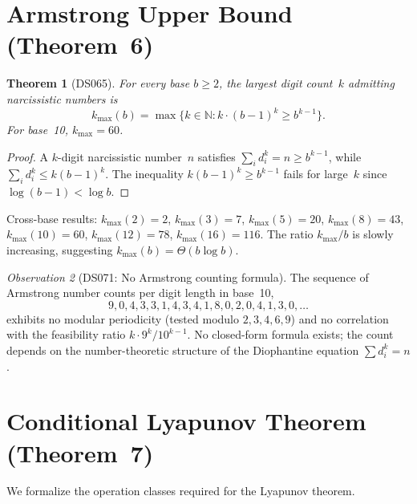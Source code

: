 \documentclass[11pt,a4paper]{amsart}
\theoremstyle{plain}
\newtheorem{theorem}{Theorem}
\theoremstyle{definition}
\theoremstyle{remark}
\newtheorem{observation}[theorem]{Observation}
\begin{document}
\section{Armstrong Upper Bound (Theorem~6)}\label{sec:armstrong}

\begin{theorem}[DS065]\label{thm:armstrong}
For every base $b \geq 2$, the largest digit count~$k$ admitting narcissistic
numbers is
\[
k_{\max}(b) = \max\{k \in \mathbb{N} : k \cdot (b{-}1)^k \geq b^{k-1}\}.
\]
For base~10, $k_{\max} = 60$.
\end{theorem}

\begin{proof}
A $k$-digit narcissistic number~$n$ satisfies $\sum_i d_i^k = n \geq b^{k-1}$,
while $\sum_i d_i^k \leq k(b{-}1)^k$. The inequality $k(b{-}1)^k \geq b^{k-1}$
fails for large~$k$ since $\log(b{-}1) < \log b$.
\end{proof}

Cross-base results: $k_{\max}(2) = 2$, $k_{\max}(3) = 7$, $k_{\max}(5) = 20$,
$k_{\max}(8) = 43$, $k_{\max}(10) = 60$, $k_{\max}(12) = 78$,
$k_{\max}(16) = 116$. The ratio $k_{\max}/b$ is slowly increasing, suggesting
$k_{\max}(b) = \Theta(b \log b)$.

\begin{observation}[DS071: No Armstrong counting formula]
The sequence of Armstrong number counts per digit length in base~10,
\[
9, 0, 4, 3, 3, 1, 4, 3, 4, 1, 8, 0, 2, 0, 4, 1, 3, 0, \ldots
\]
exhibits no modular periodicity (tested modulo $2, 3, 4, 6, 9$) and no
correlation with the feasibility ratio $k \cdot 9^k / 10^{k-1}$.
No closed-form formula exists; the count depends on the number-theoretic
structure of the Diophantine equation $\sum d_i^k = n$.
\end{observation}

\section{Conditional Lyapunov Theorem (Theorem~7)}\label{sec:lyapunov-cond}

We formalize the operation classes required for the Lyapunov theorem.
\end{document}
